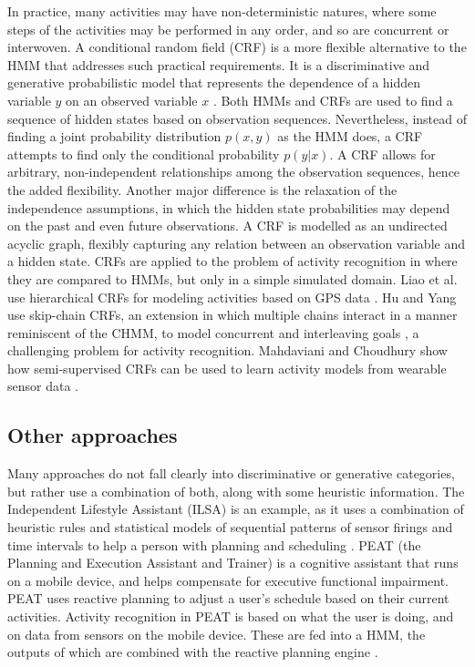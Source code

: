 In practice, many activities may have non-deterministic natures, where some steps of the activities may be performed in any order, and so are concurrent or interwoven. A conditional random field (CRF) is a more flexible alternative to the HMM that addresses such practical requirements. It is a discriminative and generative probabilistic model that represents the dependence of a hidden variable $y$ on an observed variable $x$ \cite{Sutton2007}. Both HMMs and CRFs are used to find a sequence of hidden states based on observation sequences. Nevertheless, instead of finding a joint probability distribution $p(x,y)$ as the HMM does, a CRF attempts to find only the conditional probability $p(y|x)$. A CRF allows for arbitrary, non-independent relationships among the observation sequences, hence the added flexibility. Another major difference is the relaxation of the independence assumptions, in which the hidden state probabilities may depend on the past and even future observations. A CRF is modelled as an undirected acyclic graph, flexibly capturing any relation between an observation variable and a hidden state. CRFs are applied to the problem of activity recognition in \cite{Vail2007} where they are compared to HMMs, but only in a simple simulated domain. Liao et al. use hierarchical CRFs for modeling activities based on GPS data \cite{Liao2007}. Hu and Yang use skip-chain CRFs, an extension in which multiple chains interact in a manner reminiscent of the CHMM, to model concurrent and interleaving goals \cite{Hu2008}, a challenging problem for activity recognition. Mahdaviani and Choudhury show how semi-supervised CRFs can be used to learn activity models from wearable sensor data \cite{Mahdaviani2008}.

\subsection{Other approaches}

Many approaches do not fall clearly into discriminative or generative categories, but rather use a combination of both, along with some heuristic information. The Independent Lifestyle Assistant (ILSA) is an example, as it uses a combination of heuristic rules and statistical models of sequential patterns of sensor firings and time intervals to help a person with planning and scheduling \cite{Guralnik2002}. PEAT (the Planning and Execution Assistant and Trainer) is a cognitive assistant that runs on a mobile device, and helps compensate for executive functional impairment. PEAT uses reactive planning to adjust a user’s schedule based on their current activities. Activity recognition in PEAT is based on what the user is doing, and on data from sensors on the mobile device. These are fed into a HMM, the outputs of which are combined with the reactive planning engine \cite{Modayil2008}.

